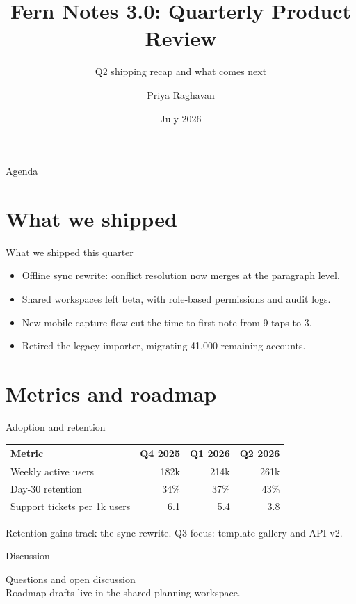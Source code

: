 \documentclass[aspectratio=169]{beamer}
\title[Fern Notes 3.0 Review]{Fern Notes 3.0: Quarterly Product Review}
\subtitle{Q2 shipping recap and what comes next}
\author[P. Raghavan]{Priya Raghavan}
\institute[Fernworks]{Product Team, Fernworks}
\date{July 2026}
\begin{document}
\begin{frame}
  \titlepage
\end{frame}

\begin{frame}{Agenda}
  \tableofcontents
\end{frame}

\section{What we shipped}

\begin{frame}{What we shipped this quarter}
  \begin{itemize}
    \item Offline sync rewrite: conflict resolution now merges at the paragraph level.
    \item Shared workspaces left beta, with role-based permissions and audit logs.
    \item New mobile capture flow cut the time to first note from 9 taps to 3.
    \item Retired the legacy importer, migrating 41,000 remaining accounts.
  \end{itemize}
\end{frame}

\section{Metrics and roadmap}

\begin{frame}{Adoption and retention}
  \begin{table}
    \centering
    \begin{tabular}{lrrr}
      \toprule
      Metric & Q4 2025 & Q1 2026 & Q2 2026 \\
      \midrule
      Weekly active users & 182k & 214k & 261k \\
      Day-30 retention & 34\% & 37\% & 43\% \\
      Support tickets per 1k users & 6.1 & 5.4 & 3.8 \\
      \bottomrule
    \end{tabular}
  \end{table}
  \vspace{0.5em}
  Retention gains track the sync rewrite. Q3 focus: template gallery and API v2.
\end{frame}

\begin{frame}{Discussion}
  \begin{center}
    {\Large Questions and open discussion}\\[1em]
    Roadmap drafts live in the shared planning workspace.
  \end{center}
\end{frame}
\end{document}
